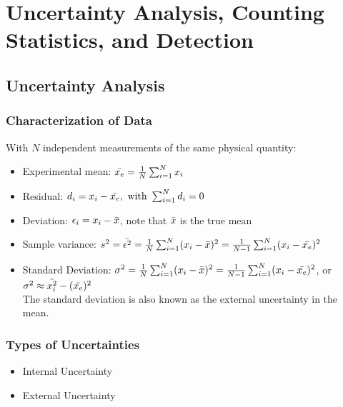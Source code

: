 \section{Uncertainty Analysis, Counting Statistics, and Detection}
\subsection{Uncertainty Analysis}
\subsubsection{Characterization of Data}
With $N$ independent measurements of the same physical quantity:
\begin{itemize}
    \item Experimental mean: $\Bar{x_e}=\frac{1}{N}\sum_{i=1}^Nx_i$
    \item Residual: $d_i=x_i-\Bar{x_e},\text{ with }\sum_{i=1}^Nd_i=0$
    \item Deviation: $\epsilon_i=x_i-\Bar{x}$, note that $\Bar{x}$ is the true mean 
    \item Sample variance: $s^2=\Bar{\epsilon^2}=\frac{1}{N}\sum_{i=1}^N(x_i-\Bar{x})^2=\frac{1}{N-1}\sum_{i=1}^N(x_i-\Bar{x_e})^2$
    \item Standard Deviation: $\sigma^2=\frac{1}{N}\sum_{i=1}^N(x_i-\Bar{x})^2=\frac{1}{N-1}\sum_{i=1}^N(x_i-\Bar{x_e})^2$, or $\sigma^2\approx\Bar{x_i^2}-(\Bar{x_e})^2$\\
    The standard deviation is also known as the external uncertainty in the mean.
\end{itemize}
\subsubsection{Types of Uncertainties}
\begin{itemize}
    \item Internal Uncertainty
    \item External Uncertainty
\end{itemize}
